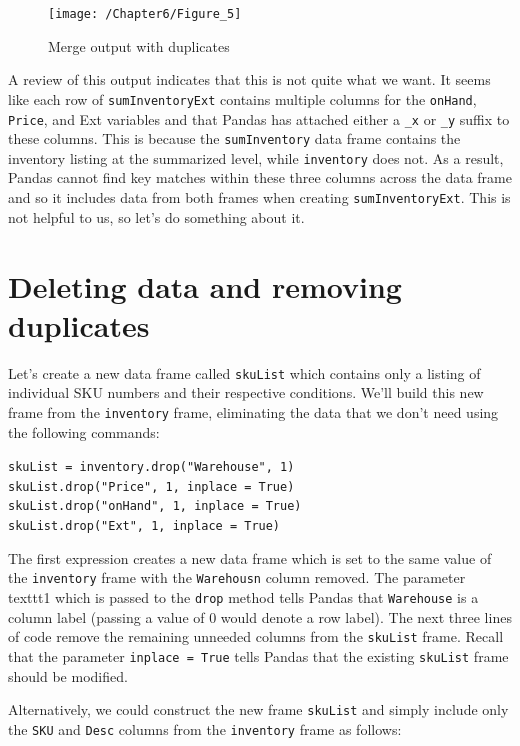 \documentclass{book}
\begin{document}
\begin{figure}[h]
	\caption{Merge output with duplicates}
	\centering\texttt{[image: /Chapter6/Figure\_5]}
\end{figure}

A review of this output indicates that this is not quite what we want. It seems like each row of \texttt{sumInventoryExt} contains multiple columns for the \texttt{onHand}, \texttt{Price}, and {Ext} variables and that Pandas has attached either a \texttt{\_x} or \texttt{\_y} suffix to these columns. This is because the \texttt{sumInventory} data frame contains the inventory listing at the summarized level, while \texttt{inventory} does not. As a result, Pandas cannot find key matches within these three columns across the data frame and so it includes data from both frames when creating \texttt{sumInventoryExt}. This is not helpful to us, so let's do something about it.

\section{Deleting data and removing duplicates}

Let's create a new data frame called \texttt{skuList} which contains only a listing of individual SKU numbers and their respective conditions. We'll build this new frame from the \texttt{inventory} frame, eliminating the data that we don't need using the following commands:

\texttt{skuList = inventory.drop("Warehouse", 1)\\
skuList.drop("Price", 1, inplace = True)\\
skuList.drop("onHand", 1, inplace = True)\\
skuList.drop("Ext", 1, inplace = True)\\}

The first expression creates a new data frame which is set to the same value of the \texttt{inventory} frame with the \texttt{Warehousn} column removed. The parameter \\texttt{1} which is passed to the \texttt{drop} method tells Pandas that \texttt{Warehouse} is a column label (passing a value of 0 would denote a row label). The next three lines of code remove the remaining unneeded columns from the \texttt{skuList} frame. Recall that the parameter \texttt{inplace = True} tells Pandas that the existing \texttt{skuList} frame should be modified.

Alternatively, we could construct the new frame \texttt{skuList} and simply include only the \texttt{SKU} and \texttt{Desc} columns from the \texttt{inventory} frame as follows:
\end{document}

